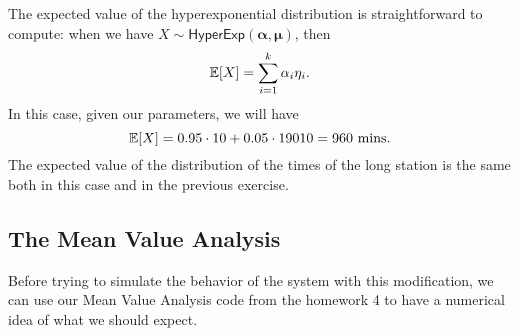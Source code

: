 \documentclass[12pt]{article}
\begin{document}
The expected value of the hyperexponential distribution is straightforward to compute: when we have $X\sim\mathsf{HyperExp}(\mathbf{\alpha},\mathbf{\mu})$, then
\begin{equation*}
	\mathbb{E}[X]=\sum_{i=1}^{k}\alpha_i\eta_i.
\end{equation*}
In this case, given our parameters, we will have
\begin{equation*}
	\mathbb{E}[X]=0.95\cdot 10+0.05\cdot19010=960\text{ mins}.
\end{equation*}
The expected value of the distribution of the times of the long station is the same both in this case and in the previous exercise. \\
\subsection{The Mean Value Analysis}
Before trying to simulate the behavior of the system with this modification, we can use our Mean Value Analysis code from the homework 4 to have a numerical idea of what we should expect.
\end{document}
